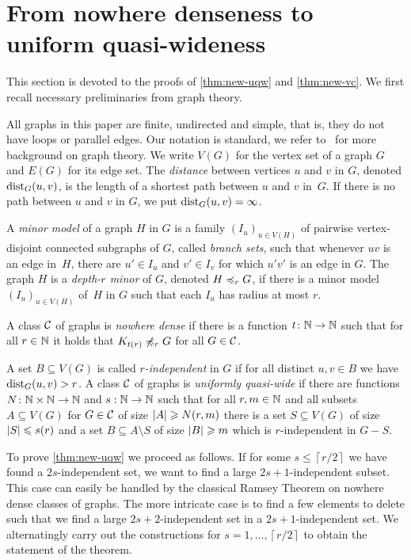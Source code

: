 \section{From nowhere denseness to uniform quasi-wideness}\label{sec:uqw}

This section is devoted to the proofs of \cref{thm:new-uqw} and \cref{thm:new-vc}. 
We first recall necessary preliminaries from graph theory. 

All graphs in this paper are finite, undirected and simple, that is, 
they do not have loops or parallel edges. Our notation is standard,
we refer to~\cite{diestel2012graph} for more background on 
graph theory. 
We write $V(G)$ for the vertex set of a graph $G$ and
$E(G)$ for its edge set. 
The {\em{distance}} between vertices $u$ and $v$ in $G$, denoted $\mathrm{dist}_G(u,v)$, is the length of a shortest path between $u$ and $v$ in~$G$.
If there is no path between $u$ and $v$ in $G$, we put $\mathrm{dist}_G(u,v)=\infty$.

A {\em{minor model}} of a graph $H$ in $G$ is a family $(I_u)_{u\in V(H)}$ of pairwise vertex-disjoint connected subgraphs of $G$, called {\em{branch sets}},
such that whenever $uv$ is an edge in~$H$, there are $u'\in I_u$ and $v'\in I_v$ for which $u'v'$ 
is an edge in $G$.
The graph $H$ is a {\em{depth-$r$ minor}} of $G$, denoted $H\preccurlyeq_rG$, if there is a minor model
$(I_u)_{u\in V(H)}$ of~$H$ in $G$ such that each $I_u$ has radius at most $r$.

A class $\mathcal{C}$ of graphs is \emph{nowhere dense} if there is a function 
$t\colon \mathbb{N}\rightarrow \mathbb{N}$ such that for all $r\in \mathbb{N}$ it holds that $K_{t(r)}\not\preccurlyeq_r G$
for all $G\in \mathcal{C}$. 

A set $B\subseteq V(G)$ is called {\em{$r$-independent}} in $G$ if for all
distinct $u,v\in B$ we have $\mathrm{dist}_G(u,v)>r$.
A class $\mathcal{C}$ of graphs is \emph{uniformly quasi-wide} if there are
functions $N\colon \mathbb{N}\times\mathbb{N}\rightarrow \mathbb{N}$ and $s:\mathbb{N}\rightarrow \mathbb{N}$ such
that for all $r,m\in \mathbb{N}$ and all subsets $A\subseteq V(G)$ for
$G\in \mathcal{C}$ of size $\left\lvert A\right\rvert\geqslant N(r,m)$ there is a set
$S\subseteq V(G)$ of size $\left\lvert S\right\rvert\leqslant s(r)$ and a set
$B\subseteq A\setminus S$ of size $\left\lvert B\right\rvert\geqslant m$ which is $r$-independent in
$G-S$. 

To prove \cref{thm:new-uqw} we proceed as follows. 
If for some $s\leq \left\lceil r/2\right\rceil$
we have found a $2s$-independent set, we want to find a large 
$2s+1$-independent subset. This case can easily be handled by the classical Ramsey 
Theorem on nowhere dense classes of graphs. The more
intricate case is to find a few elements to delete such that
we find a large $2s+2$-independent set in a $2s+1$-independent set. 
We alternatingly carry out the constructions for $s=1,\ldots, \left\lceil r/2\right\rceil$ to 
obtain the statement of the theorem. 


